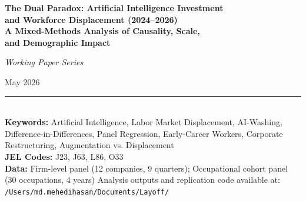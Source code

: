 \documentclass[12pt, a4paper]{article}
\begin{document}

\begin{titlepage}
  \centering
  \vspace*{1.5cm}
  {\LARGE\bfseries\color{darkblue}
    The Dual Paradox: Artificial Intelligence Investment\\[6pt]
    and Workforce Displacement (2024--2026)\\[6pt]
    \large A Mixed-Methods Analysis of Causality, Scale,\\
    and Demographic Impact\par}
  \vspace{1.8cm}
  {\large\itshape Working Paper Series\par}
  \vspace{0.4cm}
  {\normalsize May 2026\par}
  \vspace{2.5cm}
  \rule{0.5\linewidth}{0.5pt}\\[0.5cm]
  {\small
    \textbf{Keywords:} Artificial Intelligence, Labor Market Displacement,
    AI-Washing, Difference-in-Differences, Panel Regression, Early-Career Workers,
    Corporate Restructuring, Augmentation vs. Displacement\\[6pt]
    \textbf{JEL Codes:} J23, J63, L86, O33\\[6pt]
    \textbf{Data:} Firm-level panel (12 companies, 9 quarters);
    Occupational cohort panel (30 occupations, 4 years)
  }
  \vfill
  {\scriptsize
    Analysis outputs and replication code available at:\\
    \texttt{/Users/md.mehedihasan/Documents/Layoff/}
  }
\end{titlepage}
\end{document}
